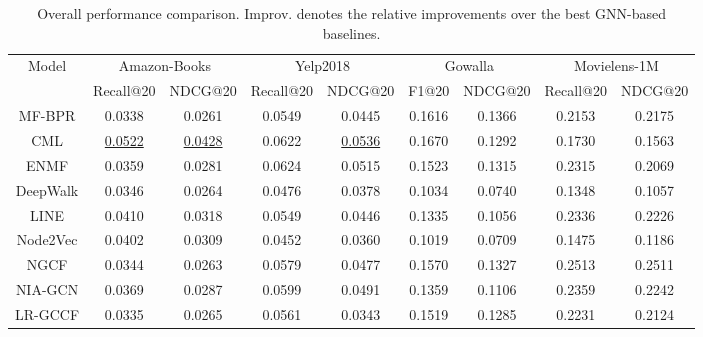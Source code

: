 \documentclass[sigconf,authorversion]{acmart}
\begin{document}
\begin{table*}[!t]
\centering
\caption{Overall performance comparison. Improv. denotes the relative improvements over the best GNN-based baselines.}
\begin{tabular}{c|cc|cc|cc|cc}
\toprule
\multirow{2}{*}{Model} & \multicolumn{2}{c|}{Amazon-Books} & \multicolumn{2}{c|}{Yelp2018}     & \multicolumn{2}{c|}{Gowalla}      & \multicolumn{2}{c}{Movielens-1M}  \\ \cline{2-9} 
                       & Recall@20       & NDCG@20         & Recall@20       & NDCG@20         & F1@20           & NDCG@20         & Recall@20       & NDCG@20         \\ \midrule
MF-BPR                 & 0.0338          & 0.0261          & 0.0549          & 0.0445          & 0.1616          & 0.1366          & 0.2153          & 0.2175          \\
CML                    & \underline{0.0522}          & \underline{0.0428}          & 0.0622          & \underline{0.0536}          & 0.1670          & 0.1292          & 0.1730          & 0.1563          \\
ENMF                   & 0.0359          & 0.0281          & 0.0624          & 0.0515          & 0.1523          & 0.1315          & 0.2315          & 0.2069          \\ \hline
DeepWalk               & 0.0346          & 0.0264          & 0.0476          & 0.0378          & 0.1034          & 0.0740          & 0.1348          & 0.1057          \\
LINE                   & 0.0410          & 0.0318          & 0.0549          & 0.0446          & 0.1335          & 0.1056          & 0.2336          & 0.2226          \\
Node2Vec               & 0.0402          & 0.0309          & 0.0452          & 0.0360          & 0.1019          & 0.0709          & 0.1475          & 0.1186          \\ \hline
NGCF                   & 0.0344          & 0.0263          & 0.0579          & 0.0477          & 0.1570          & 0.1327          & 0.2513               & 0.2511               \\
NIA-GCN                & 0.0369          & 0.0287          & 0.0599          & 0.0491          & 0.1359          & 0.1106          & 0.2359          & 0.2242          \\
LR-GCCF                & 0.0335          & 0.0265          & 0.0561          & 0.0343          & 0.1519          & 0.1285          & 0.2231          & 0.2124          \\

\end{tabular}
\end{table*}
\end{document}
